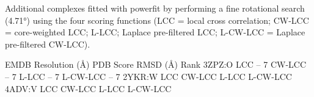 \caption{}
{Additional complexes fitted with powerfit by performing a fine rotational
search (4.71°) using the four scoring functions (LCC = local cross correlation;
CW-LCC = core-weighted LCC; L-LCC; Laplace pre-filtered LCC; L-CW-LCC = Laplace
pre-filtered CW-LCC).}
\stopbuffer

\setupTABLE[width=fit, frame=off]
\setupTABLE[bottomframe=on]
\setupTABLE[4, 5, 6][2, 3, 4, 6, 7, 8, 10, 11, 12][bottomframe=off]
\setupTABLE[r][1][topframe=on]
\bTABLE[align={center, lohi}]
\bTR \bTD EMDB \eTD \bTD Resolution (Å) \eTD \bTD PDB \eTD \bTD Score \eTD \bTD RMSD (Å) \eTD \bTD Rank \eTD \eTR
\bTR {} \eTD {} \eTD \bTD[nr=4] 3ZPZ:O \eTD \bTD LCC \eTD {} \eTD {} -- 7 \eTD \eTR
\bTR \bTD CW-LCC \eTD {} \eTD {} -- 7 \eTD \eTR
\bTR \bTD L-LCC \eTD {} \eTD {} -- 7 \eTD \eTR
\bTR \bTD L-CW-LCC \eTD {} \eTD {} -- 7 \eTD \eTR
%
\bTR {} \eTD {} \eTD \bTD[nr=4] 2YKR:W \eTD \bTD LCC \eTD {} \eTD {} \eTD \eTR
\bTR \bTD CW-LCC \eTD {} \eTD {} \eTD \eTR
\bTR \bTD L-LCC \eTD {} \eTD {} \eTD \eTR
\bTR \bTD L-CW-LCC \eTD {} \eTD {} \eTD \eTR
%
\bTR {} \eTD {} \eTD \bTD[nr=4] 4ADV:V \eTD \bTD LCC \eTD {} \eTD {} \eTD \eTR
\bTR \bTD CW-LCC \eTD {} \eTD {} \eTD \eTR
\bTR \bTD L-LCC \eTD {} \eTD {} \eTD \eTR
\bTR \bTD L-CW-LCC \eTD {} \eTD {} \eTD \eTR
\eTABLE
\stopbuffer

